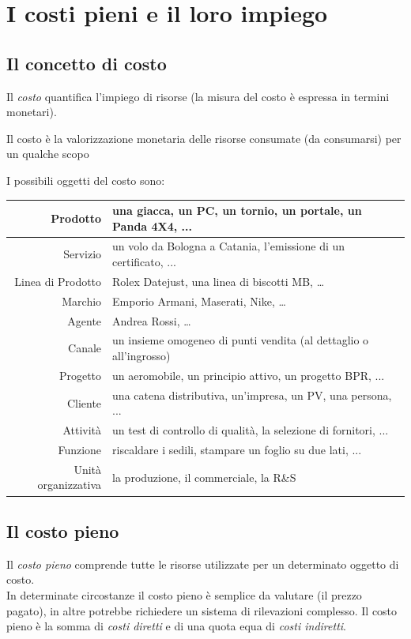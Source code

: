 \documentclass{article}
\begin{document}
\section{I costi pieni e il loro impiego}
\subsection{Il concetto di costo}
Il \textit{costo} quantifica l'impiego di risorse (la misura del costo è espressa in termini monetari).
\begin{center}
    Il costo è la valorizzazione monetaria delle risorse consumate (da consumarsi) per un qualche scopo
\end{center}
I possibili oggetti del costo sono:\
\begin{center}
  \begin{tabular}{|r|l|}
    \hline
    Prodotto & una giacca, un PC, un tornio, un portale, un Panda 4X4, ...\\
    \hline 
    Servizio & un volo da Bologna a Catania, l'emissione di un certificato, ... \\
    \hline 
    Linea di Prodotto & Rolex Datejust, una linea di biscotti MB, \dots \\ 
    \hline 
    Marchio & Emporio Armani, Maserati, Nike, \dots \\
    \hline 
    Agente & Andrea Rossi, \dots \\
    \hline 
    Canale & un insieme omogeneo di punti vendita (al dettaglio o all'ingrosso)\\
    \hline
    Progetto & un aeromobile, un principio attivo, un progetto BPR, ... \\
    \hline
    Cliente & una catena distributiva, un'impresa, un PV, una persona, ... \\
    \hline 
    Attività & un test di controllo di qualità, la selezione di fornitori, ... \\
    \hline
    Funzione & riscaldare i sedili, stampare un foglio su due lati, ... \\ 
    \hline
    Unità organizzativa & la produzione, il commerciale, la R\&S \\
    \hline 
 \end{tabular}  
\end{center}



\subsection{Il costo pieno}
Il \textit{costo pieno} comprende tutte le risorse utilizzate per un determinato oggetto di costo.\\
In determinate circostanze il costo pieno è semplice da valutare (il prezzo pagato), in altre potrebbe richiedere un sistema di rilevazioni complesso. Il costo pieno è la somma di \textit{costi diretti} e di una quota equa di \textit{costi indiretti}.
\end{document}
